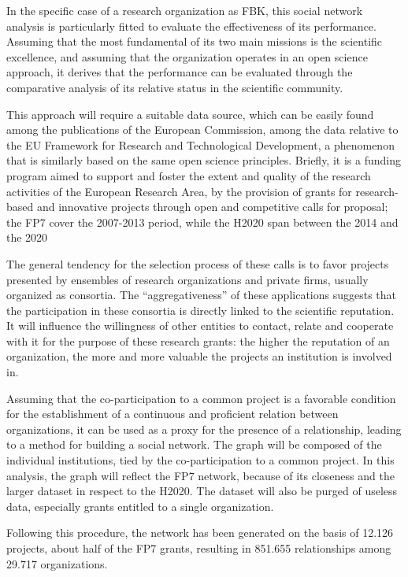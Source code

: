 In the specific case of a research organization as FBK, this social network analysis is particularly fitted to evaluate the effectiveness of its performance. Assuming that the most fundamental of its two main missions is the scientific excellence, and assuming that the organization operates in an open science approach, it derives that the performance can be evaluated through the comparative analysis of its relative status in the scientific community.

This approach will require a suitable data source, which can be easily found among the publications of the European Commission, among the data relative to the EU Framework for Research and Technological Development, a phenomenon that is similarly based on the same open science principles. Briefly, it is a funding program aimed to support and foster the extent and quality of the research activities of the European Research Area, by the provision of grants for research-based and innovative projects through open and competitive calls for proposal; the FP7 cover the 2007-2013 period, while the H2020 span between the 2014 and the 2020

The general tendency for the selection process of these calls is to favor projects presented by ensembles of research organizations and private firms, usually organized as consortia. The \enquote{aggregativeness} of these applications suggests that the participation in these consortia is directly linked to the scientific reputation. It will influence the willingness of other entities to contact, relate and cooperate with it for the purpose of these research grants: the higher the reputation of an organization, the more and more valuable the projects an institution is involved in.

Assuming that the co-participation to a common project is a favorable condition for the establishment of a continuous and proficient relation between organizations, it can be used as a proxy for the presence of a relationship, leading to a method for building a social network. The graph will be composed of the individual institutions, tied by the co-participation to a common project. In this analysis, the graph will reflect the FP7 network, because of its closeness and the larger dataset in respect to the H2020. The dataset will also be purged of useless data, especially grants entitled to a single organization. 

Following this procedure, the network has been generated on the basis of 12.126 projects, about half of the FP7 grants, resulting in 851.655 relationships among 29.717 organizations. 

